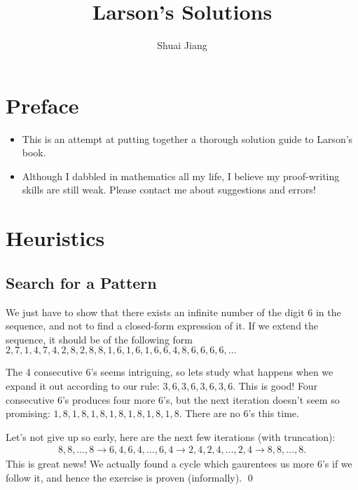 \documentclass[11pt]{book} %
\title{Larson's Solutions}
\author{Shuai Jiang}
\begin{document}
\maketitle
\chapter*{Preface}
\begin{itemize}
	\item This is an attempt at putting together a thorough solution guide to Larson's book. 
	\item Although I dabbled in mathematics all my life, I believe my proof-writing skills are still weak. Please contact me about suggestions and errors! 
\end{itemize}

\chapter{Heuristics}
\section{Search for a Pattern}
\setcounter{Exercise}{5}
\begin{Exercise}
We just have to show that there exists an infinite number of the digit 6 in the sequence, and not to find a closed-form expression of it. If we extend the sequence, it should be of the following form $2,7,1,4,7,4,2,8,2,8,8,1,6,1,6,1,6,6,4,8,6,6,6,6,\ldots$ 

The 4 consecutive 6's seems intriguing, so lets study what happens when we expand it out according to our rule: $3,6,3,6,3,6,3,6$. 
This is good! Four consecutive 6's produces four more 6's, but the next iteration doesn't seem so promising: $1,8,1,8,1,8,1,8,1,8,1,8,1,8$. There are no 6's this time. 

Let's not give up so early, here are the next few iterations (with truncation): 
\begin{align}
8,8,\ldots, 8 \rightarrow 6,4,6,4,\ldots,6,4 \rightarrow 2,4,2,4,\ldots, 2,4 \rightarrow 8,8,\ldots, 8. 
\end{align}
This is great news! We actually found a cycle which gaurentees us more 6's if we follow it, and hence the exercise is proven (informally). \qed
\end{Exercise}
\end{document}
